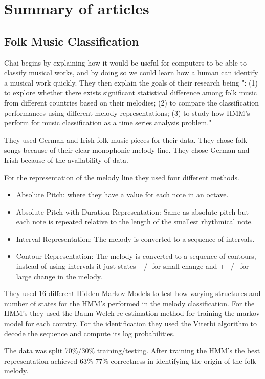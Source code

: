 \documentclass{article}
\begin{document}
	\section{Summary of articles}
	\subsection{Folk Music Classification}
	
	Chai begins by explaining how it would be useful for computers to be able to classify 
	musical works, and by doing so we could learn how a human can identify a musical work quickly. They then explain the goals of their research being ": (1) to explore whether there exists
	significant statistical difference among folk music
	from different countries based on their melodies;
	(2) to compare the classification performances
	using different melody representations; (3) to
	study how HMM’s perform for music
	classification as a time series analysis problem."

	
	They used German and Irish folk music pieces for their data. They chose folk songs because of their clear monophonic melody line. They chose German and Irish because 
	of the availability of data.
	
	For the representation of the melody line they used four different methods.
	\begin{itemize}
		\item Absolute Pitch: where they have a value for each note in an octave. 
		\item Absolute Pitch with Duration Representation: Same as absolute pitch but each note is repeated relative to the length of the smallest rhythmical note.
		\item Interval Representation: The melody is converted to a sequence of intervals. 
		\item Contour Representation: The melody is converted to a sequence of contours, instead of using intervals it just states +/- for small change and ++/-- for large change in the melody.
	\end{itemize}
	
	They used 16 different Hidden Markov Models to test how varying structures and number of states for the HMM's performed in the melody classification. For the HMM's they used the Baum-Welch re-estimation method for training the markov model for each country. For the identification they used the Viterbi algorithm to decode the sequence and compute its log probabilities. 
	
	The data was split 70\%/30\% training/testing. After training the HMM's the best representation achieved 63\%-77\% correctness in identifying the origin of the folk melody. 
	
\end{document}
